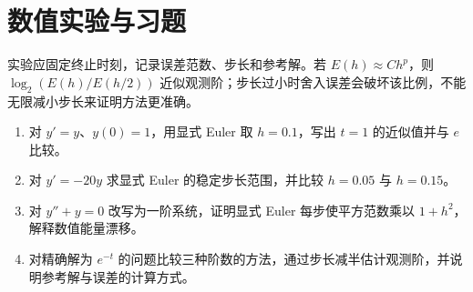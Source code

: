 \section{数值实验与习题}
实验应固定终止时刻，记录误差范数、步长和参考解。若 $E(h)\approx Ch^p$，则 $\log_2(E(h)/E(h/2))$ 近似观测阶；步长过小时舍入误差会破坏该比例，不能无限减小步长来证明方法更准确。
\begin{enumerate}
 \item\label{ex:ode-euler-value} 对 $y'=y$、$y(0)=1$，用显式 Euler 取 $h=0.1$，写出 $t=1$ 的近似值并与 $e$ 比较。
 \item\label{ex:ode-euler-stability} 对 $y'=-20y$ 求显式 Euler 的稳定步长范围，并比较 $h=0.05$ 与 $h=0.15$。
 \item 对 $y''+y=0$ 改写为一阶系统，证明显式 Euler 每步使平方范数乘以 $1+h^2$，解释数值能量漂移。
 \item 对精确解为 $e^{-t}$ 的问题比较三种阶数的方法，通过步长减半估计观测阶，并说明参考解与误差的计算方式。
\end{enumerate}

